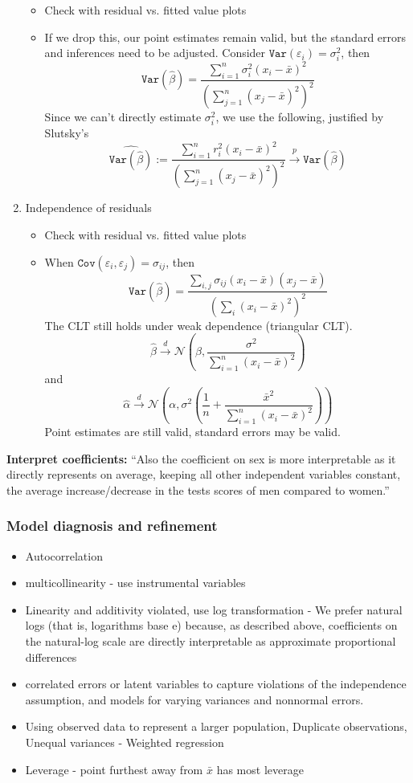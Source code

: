 \documentclass{article}
\begin{document}
\begin{enumerate}
\begin{itemize}
      \item Check with residual vs. fitted value plots
      \item If we drop this, our point estimates remain valid, but the standard errors and inferences need to be adjusted.
        Consider $\mathtt{Var}(\varepsilon_i) = \sigma^2_i$, then
        \[ \mathtt{Var}(\hat{\beta}) = \frac{\sum_{i=1}^{n}\sigma^2_i (x_i - \bar{x})^2}{(\sum_{j=1}^{n}(x_j - \bar{x})^2)^2} \]
        Since we can't directly estimate $\sigma^2_i$, we use the following, justified by Slutsky's
        \[  \widehat{\mathtt{Var}(\hat{\beta})} := \frac{\sum_{i=1}^{n} r_i^2 (x_i - \bar{x})^2 }{(\sum_{j=1}^{n}(x_j - \bar{x})^2)^2} \xrightarrow{p} \mathtt{Var}(\hat{\beta})\]
    \end{itemize}
  \item Independence of residuals
    \begin{itemize}
      \item Check with residual vs. fitted value plots
      \item When $\mathtt{Cov}(\varepsilon_i, \varepsilon_j) = \sigma_{ij}$, then
        \[ \mathtt{Var}(\hat{\beta}) = \frac{\sum_{i, j}\sigma_{ij}(x_i - \bar{x})(x_j - \bar{x})}{(\sum_i (x_i - \bar{x})^2)^2}\]
        The CLT still holds under weak dependence (triangular CLT).
        \[\hat{\beta} \xrightarrow{d} \mathcal{N}\left(\beta, \frac{\sigma^2}{\sum_{i=1}^{n}(x_i - \bar{x})^2}\right) \]
        and
        \[\hat{\alpha} \xrightarrow{d} \mathcal{N}\left(\alpha, \sigma^2 \left(\frac{1}{n} + \frac{\bar{x}^2}{\sum_{i=1}^{n}(x_i - \bar{x})^2} \right) \right) \]
        Point estimates are still valid, standard errors may be valid.
    \end{itemize}
\end{enumerate}

\textbf{Interpret coefficients:} ``Also the coefficient on sex is more interpretable as it directly represents on average, keeping  all other independent variables constant, the average increase/decrease in the tests scores of men compared to women.''
\subsubsection{Model diagnosis and refinement}
\begin{itemize}
  \item Autocorrelation
  \item multicollinearity - use instrumental variables
  \item Linearity and additivity violated, use log transformation - We prefer natural logs (that is, logarithms base e) because, as described above, coefficients on the natural-log scale are directly interpretable as approximate proportional differences
  \item correlated errors or latent variables to capture violations of the independence assumption, and models for varying variances and nonnormal errors.
  \item Using observed data to represent a larger population, Duplicate observations, Unequal variances - Weighted regression
  \item Leverage - point furthest away from $\bar{x}$ has most leverage
\end{itemize}
\end{document}
